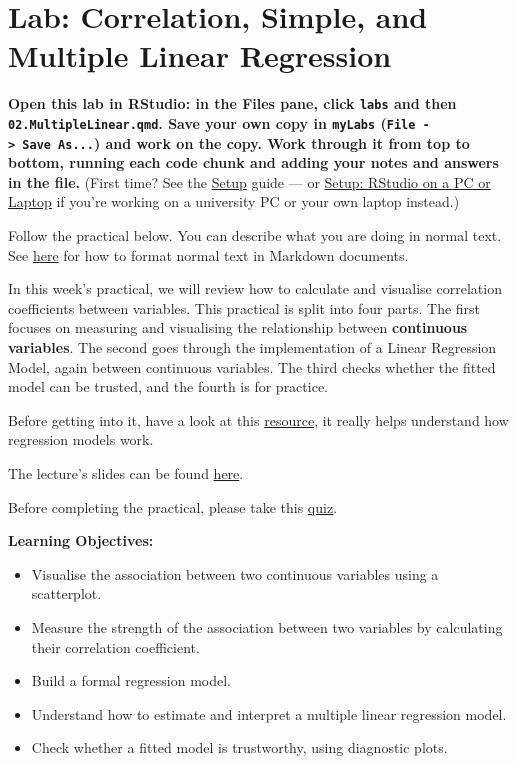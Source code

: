 \documentclass[
  letterpaper,
  DIV=11,
  numbers=noendperiod]{scrreprt}
\providecommand{\tightlist}{%
  \setlength{\itemsep}{0pt}\setlength{\parskip}{0pt}}
\begin{document}

\chapter{Lab: Correlation, Simple, and Multiple Linear
Regression}\label{lab-correlation-simple-and-multiple-linear-regression}

\textbf{Open this lab in RStudio: in the Files pane, click \texttt{labs}
and then \texttt{02.MultipleLinear.qmd}. Save your own copy in
\texttt{myLabs} (\texttt{File\ -\textgreater{}\ Save\ As...}) and work
on the copy. Work through it from top to bottom, running each code chunk
and adding your notes and answers in the file.} (First time? See the
\hyperref[setup-rstudio-in-your-browser]{Setup} guide --- or
\hyperref[setup-rstudio-on-a-pc-or-laptop]{Setup: RStudio on a PC or
Laptop} if you're working on a university PC or your own laptop
instead.)

Follow the practical below. You can describe what you are doing in
normal text. See
\href{https://quarto.org/docs/authoring/markdown-basics.html}{here} for
how to format normal text in Markdown documents.

In this week's practical, we will review how to calculate and visualise
correlation coefficients between variables. This practical is split into
four parts. The first focuses on measuring and visualising the
relationship between \textbf{continuous variables}. The second goes
through the implementation of a Linear Regression Model, again between
continuous variables. The third checks whether the fitted model can be
trusted, and the fourth is for practice.

Before getting into it, have a look at this
\href{https://mlu-explain.github.io/linear-regression/}{resource}, it
really helps understand how regression models work.

The lecture's slides can be found
\href{https://github.com/GDSL-UL/stats/blob/main/lectures/lecture02.pdf}{here}.

Before completing the practical, please take this
\href{https://canvas.liverpool.ac.uk/courses/93312/quizzes/176546}{quiz}.

\textbf{Learning Objectives:}

\begin{itemize}
\tightlist
\item
  Visualise the association between two continuous variables using a
  scatterplot.
\item
  Measure the strength of the association between two variables by
  calculating their correlation coefficient.
\item
  Build a formal regression model.
\item
  Understand how to estimate and interpret a multiple linear regression
  model.
\item
  Check whether a fitted model is trustworthy, using diagnostic plots.
\end{itemize}
\end{document}
